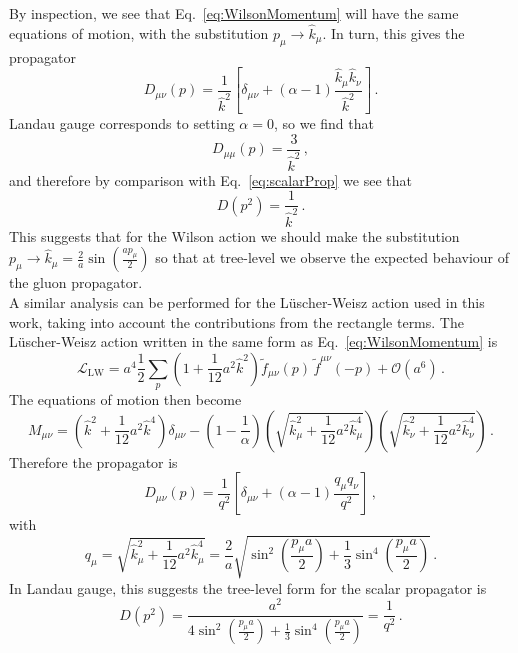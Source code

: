 %
By inspection, we see that Eq.~\eqref{eq:WilsonMomentum} will have the same equations of motion, with the substitution $p_\mu\rightarrow \hat{k}_\mu$. In turn, this gives the propagator
%
\begin{equation}
D_{\mu\nu}(p) = \frac{1}{\hat{k}^2}\left[\delta_{\mu\nu} + (\alpha-1)\frac{\hat{k}_\mu \hat{k}_\nu}{\hat{k}^2}\right]\, .
\end{equation}
Landau gauge corresponds to setting $\alpha=0$, so we find that
%
\begin{equation}
D_{\mu\mu}(p) = \frac{3}{\hat{k}^2}\, ,
\end{equation}
%
and therefore by comparison with Eq.~\eqref{eq:scalarProp} we see that
%
\begin{equation}
D(p^2) = \frac{1}{\hat{k}^2}\, .
\end{equation}
%
This suggests that for the Wilson action we should make the substitution $p_\mu\rightarrow \hat{k}_\mu = \frac{2}{a}\sin\left(\frac{a p_\mu}{2}\right)$ so that at tree-level we observe the expected behaviour of the gluon propagator.\\

A similar analysis can be performed for the L\"uscher-Weisz action used in this work, taking into account the contributions from the rectangle terms. The L\"uscher-Weisz action written in the same form as Eq.~\eqref{eq:WilsonMomentum} is~\cite{Weisz:1982zw}
%
\begin{equation}
\mathcal{L}_\text{LW} = a^4\frac{1}{2}\sum_p \left(1+\frac{1}{12}a^2\hat{k}^2\right) \tilde{f}_{\mu\nu}(p) \, \tilde{f}^{\mu\nu}(-p) + \mathcal{O}(a^6)\, .
\end{equation}
%
The equations of motion then become
%
\begin{equation}
M_{\mu\nu} = \left(\hat{k}^2 + \frac{1}{12}a^2\hat{k}^4\right)\delta_{\mu\nu} - \left(1-\frac{1}{\alpha}\right)\left(\sqrt{\hat{k}_\mu^2 + \frac{1}{12}a^2\hat{k}_\mu^4}\right)\left(\sqrt{\hat{k}_\nu^2 + \frac{1}{12}a^2\hat{k}_\nu^4}\right)\, .
\end{equation}
Therefore the propagator is
%
\begin{equation}
D_{\mu\nu}(p) = \frac{1}{q^2}\left[\delta_{\mu\nu} + (\alpha-1)\frac{q_\mu q_\nu}{q^2}\right]\, ,
\end{equation}
with
\begin{equation}
q_\mu = \sqrt{\hat{k}_\mu^2 + \frac{1}{12}a^2\hat{k}_\mu^4} = \frac{2}{a}\sqrt { \sin ^ { 2 } \left( \frac { p _ { \mu } a } { 2 } \right) + \frac { 1 } { 3 } \sin ^ { 4 } \left( \frac { p _ { \mu } a } { 2 } \right) }\, .
\end{equation}
%
In Landau gauge, this suggests the tree-level form for the scalar propagator is
%
\begin{equation}
D(p^2) = \frac{a^2}{4 \sin ^ { 2 } \left( \frac { p _ { \mu } a } { 2 } \right) + \frac { 1 } { 3 } \sin ^ { 4 } \left( \frac { p _ { \mu } a } { 2 } \right)} = \frac{1}{q^2}\, .
\label{eq:LWCorrection}
\end{equation}\\

